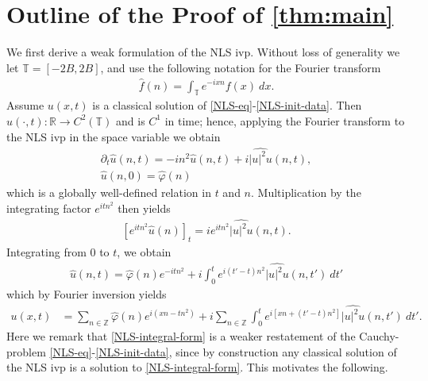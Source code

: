 \documentclass[12pt,reqno]{amsart}
\newcommand{\wh}{\widehat}
\newcommand{\rr}{\mathbb{R}}
\newcommand{\p}{\partial}
\newcommand{\zz}{\mathbb{Z}}
\newcommand{\ci}{\mathbb{T}}
\newcommand{\vp}{\varphi}
\theoremstyle{plain}  %
\begin{document}
\section{Outline of the Proof of \autoref{thm:main}}
\setcounter{equation}{1}
%
%
%
%
%
We first derive a weak formulation of the NLS ivp. Without loss of 
generality we let $\ci = [-2B, 2B]$, and use
the following notation for the Fourier transform
%
%
%
%
\begin{equation*}
	\begin{split}
		\widehat{f}(n) = \int_{\ci} e^{-ix n} f(x) \ dx.
	\end{split}
\end{equation*}
Assume 
$u(x,t)$ is a classical solution of \eqref{NLS-eq}-\eqref{NLS-init-data}.
Then $u(\cdot ,   t): \rr \to C^2(\ci)$ and is $C^1$ in time; hence, applying 
the Fourier transform to the NLS ivp in the space variable we obtain 
%
%
\begin{gather*}
	\p_t \widehat{u}(n, t) = -i n^2 \widehat{u}(n, t) + i  
	\widehat{|u|^{2} u} (n, t),
	\\
	\widehat{u} (n,0) = \widehat{\vp}(n)
\end{gather*}
%
%
which is a globally well-defined relation in $t$ 
and $n$. Multiplication by the integrating factor $e^{itn^2}$ then yields
\begin{equation*}
	\begin{split}
		\left[ e^{it n^2} \widehat{u}(n) \right]_t = i
		 e^{it n^2} \widehat{|u|^{2} u} (n, t).	
	\end{split}
\end{equation*}
%
%
Integrating from $0$ to $t$, we obtain
%
%
\begin{equation*}
	\begin{split}
		\wh{u}(n, t) = \wh{\vp}(n) e^{-it n^2} + i  
		\int_0^t e^{i(t' - t)n^2} \wh{|u|^{2} u}(n, t') \ 
		dt'
	\end{split}
\end{equation*}
%
%
which by Fourier inversion yields 
%
%
\begin{equation}
	\label{NLS-integral-form}
	\begin{split}
		u(x,t) & = \sum_{n \in \zz} \wh{\vp}(n) e^{i\left( xn - t n^2 
		\right)} 
		 + i \sum_{n \in \zz} \int_0^t e^{i\left[ xn + \left( t' - t 
		\right)n^2 \right]} \wh{|u|^2 u}(n, t') \ dt'.
	\end{split}
\end{equation}
%
%
Here we remark that \eqref{NLS-integral-form} is a weaker 
restatement of the Cauchy-problem \eqref{NLS-eq}-\eqref{NLS-init-data}, 
since by construction any classical solution of the NLS ivp is a solution to 
\eqref{NLS-integral-form}. This motivates the following.
\end{document}
